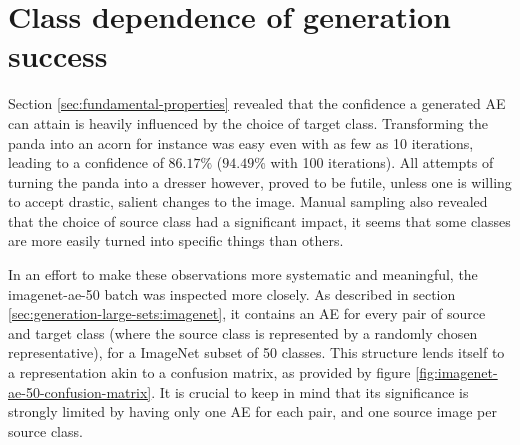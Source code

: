 \documentclass[11pt, a4paper]{article}
\begin{document}









\section{Class dependence of generation success}
\label{sec:class-dependence-generation-success}
Section \ref{sec:fundamental-properties} revealed that the confidence a generated AE can attain is heavily influenced by the choice of target class. Transforming the panda into an acorn for instance was easy even with as few as 10 iterations, leading to a confidence of $86.17\%$ ($94.49\%$ with 100 iterations). All attempts of turning the panda into a dresser however, proved to be futile, unless one is willing to accept drastic, salient changes to the image. Manual sampling also revealed that the choice of source class had a significant impact, it seems that some classes are more easily turned into specific things than others.

In an effort to make these observations more systematic and meaningful, the imagenet-ae-50 batch was inspected more closely. As described in section \ref{sec:generation-large-sets:imagenet}, it contains an AE for every pair of source and target class (where the source class is represented by a randomly chosen representative), for a ImageNet subset of 50 classes. This structure lends itself to a representation akin to a confusion matrix, as provided by figure \ref{fig:imagenet-ae-50-confusion-matrix}. It is crucial to keep in mind that its significance is strongly limited by having only one AE for each pair, and one source image per source class.
\end{document}
